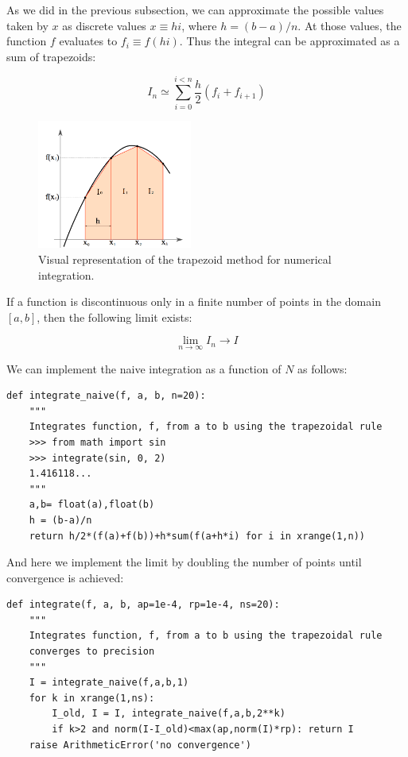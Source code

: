 \documentclass[justified,sixbynine]{tufte-book}
\def\ft{\small\tt}
\theoremstyle{plain}%
\theoremstyle{definition}
\theoremstyle{remark}
\begin{document}
\begin{fullwidth}
As we did in the previous subsection, we can approximate the possible values taken by $x$ as discrete values $x\equiv h i$, where $h=(b-a)/n$. At those values, the function $f$ evaluates to $f_i \equiv f(h i)$. Thus the integral can be approximated as a sum of trapezoids:

\begin{equation}
  I_n \simeq \sum_{i=0}^{i<n} \frac{h}{2}(f_i+f_{i+1})
\end{equation}

\begin{figure}[ht]
\centering\includegraphics[width=2in]{images/integral2.png}
\caption{Visual representation of the trapezoid method for numerical integration.}
\end{figure}

If a function is discontinuous only in a finite number of points in the domain $[a,b]$, then the following limit exists:

\begin{equation}
\lim_{n\rightarrow\infty} I_n \rightarrow I
\end{equation}

We can implement the naive integration as a function of $N$ as follows:

\begin{lstlisting}[caption={in file: {\ft nlib.py}}]
def integrate_naive(f, a, b, n=20):
    """
    Integrates function, f, from a to b using the trapezoidal rule
    >>> from math import sin
    >>> integrate(sin, 0, 2)
    1.416118...
    """
    a,b= float(a),float(b)
    h = (b-a)/n
    return h/2*(f(a)+f(b))+h*sum(f(a+h*i) for i in xrange(1,n))
\end{lstlisting}

And here we implement the limit by doubling the number of points until convergence is achieved:

\begin{lstlisting}[caption={in file: {\ft nlib.py}}]
def integrate(f, a, b, ap=1e-4, rp=1e-4, ns=20):
    """
    Integrates function, f, from a to b using the trapezoidal rule
    converges to precision
    """
    I = integrate_naive(f,a,b,1)
    for k in xrange(1,ns):
        I_old, I = I, integrate_naive(f,a,b,2**k)
        if k>2 and norm(I-I_old)<max(ap,norm(I)*rp): return I
    raise ArithmeticError('no convergence')
\end{lstlisting}


\end{fullwidth}
\end{document}
